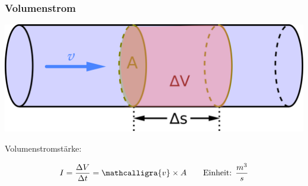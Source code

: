 \documentclass{beamer}
\begin{document}
\begin{frame}
\frametitle{Volumenstrom}


\begin{center}
\includegraphics[width=\textwidth]{volumenstrom.png}
\end{center}

Volumenstromstärke:
 
\[
I = \frac{\Delta V}{\Delta t} = \mathcalligra{v}\times A  \qquad \text{Einheit: } \frac{m^3}{s}
\]

\end{frame}
\end{document}
